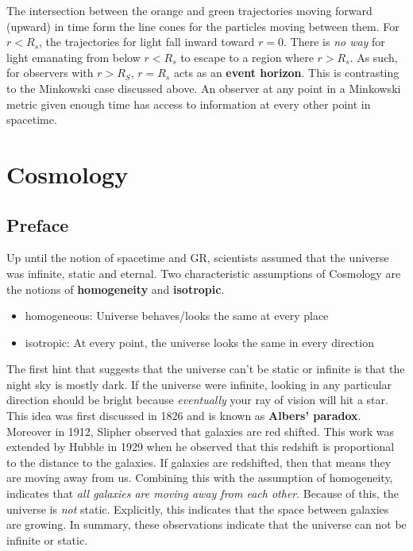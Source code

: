 \documentclass{article}
\begin{document}
The intersection between the orange and green trajectories moving forward (upward) in time form the line cones for the particles moving between them. For $r < R_s$, the trajectories for light fall inward toward $r = 0$. There is \textit{no way} for light emanating from below $r < R_s$ to escape to a region where $r > R_s$. As such, for observers with $r>R_S$, $r = R_s$ acts as an \textbf{event horizon}. This is contrasting to the Minkowski case discussed above. An observer at any point in a Minkowski metric given enough time has access to information at every other point in spacetime.

\section{Cosmology}

\subsection{Preface}
Up until the notion of spacetime and GR, scientists assumed that the universe was infinite, static and eternal. Two characteristic assumptions of Cosmology are the notions of \textbf{homogeneity} and \textbf{isotropic}.
\begin{itemize}
    \item homogeneous: Universe behaves/looks the same at every place
    \item isotropic: At every point, the universe looks the same in every direction
\end{itemize}
The first hint that suggests that the universe can't be static or infinite is that the night sky is mostly dark. If the universe were infinite, looking in any particular direction should be bright because \textit{eventually} your ray of vision will hit a star. This idea was first discussed in 1826 and is known as \textbf{Albers' paradox}. Moreover in 1912, Slipher observed that galaxies are red shifted. This work was extended by Hubble in 1929 when he observed that this redshift is proportional to the distance to the galaxies. If galaxies are redshifted, then that means they are moving away from us. Combining this with the assumption of homogeneity, indicates that \textit{all galaxies are moving away from each other}. Because of this, the universe is \textit{not} static. Explicitly, this indicates that the space between galaxies are growing. In summary, these observations indicate that the universe can not be infinite or static. \\
\end{document}
